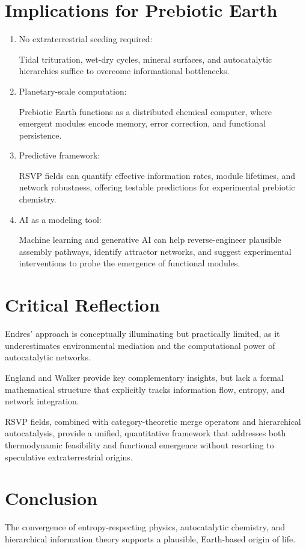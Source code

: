 \documentclass{book}
\begin{document}
\section{Implications for Prebiotic Earth}
\begin{enumerate}
\item No extraterrestrial seeding required:

Tidal trituration, wet-dry cycles, mineral surfaces, and autocatalytic hierarchies suffice to overcome informational bottlenecks.
\item Planetary-scale computation:

Prebiotic Earth functions as a distributed chemical computer, where emergent modules encode memory, error correction, and functional persistence.
\item Predictive framework:

RSVP fields can quantify effective information rates, module lifetimes, and network robustness, offering testable predictions for experimental prebiotic chemistry.
\item AI as a modeling tool:

Machine learning and generative AI can help reverse-engineer plausible assembly pathways, identify attractor networks, and suggest experimental interventions to probe the emergence of functional modules.
\end{enumerate}

\section{Critical Reflection}
Endres’ approach is conceptually illuminating but practically limited, as it underestimates environmental mediation and the computational power of autocatalytic networks.

England and Walker provide key complementary insights, but lack a formal mathematical structure that explicitly tracks information flow, entropy, and network integration.

RSVP fields, combined with category-theoretic merge operators and hierarchical autocatalysis, provide a unified, quantitative framework that addresses both thermodynamic feasibility and functional emergence without resorting to speculative extraterrestrial origins.

\section{Conclusion}
The convergence of entropy-respecting physics, autocatalytic chemistry, and hierarchical information theory supports a plausible, Earth-based origin of life.
\end{document}
